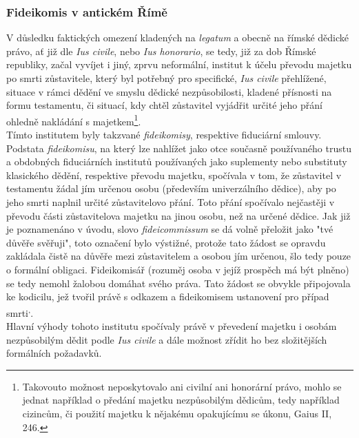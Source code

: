 \documentclass{article}
\begin{document}

\subsubsection{Fideikomis v antickém Římě}

V důsledku faktických omezení kladených na \textit{legatum} a obecně na římské dědické právo, ať již dle \textit{Ius civile}, nebo \textit{Ius honorario}, se tedy, již za dob Římské republiky, začal vyvíjet i jiný, zprvu neformální, institut k účelu převodu majetku po smrti zůstavitele, který byl potřebný pro specifické, \textit{Ius civile} přehlížené, situace v rámci dědění ve smyslu dědické nezpůsobilosti, kladené přísnosti na formu testamentu, či situací, kdy chtěl zůstavitel vyjádřit určité jeho přání ohledně nakládání s majetkem\footnote{Takovouto možnost neposkytovalo ani civilní ani honorární právo, mohlo se jednat například o předání majetku nezpůsobilým dědicům, tedy například cizincům, či použití majetku k nějakému opakujícímu se úkonu, Gaius II, 246.}.\\

 Tímto institutem byly takzvané \textit{fideikomisy}, respektive fiduciární smlouvy. Podstata \textit{fideikomisu}, na který lze nahlížet jako otce současně používaného trustu a obdobných fiduciárních institutů používaných jako suplementy nebo substituty klasického dědění, respektive převodu majetku, spočívala v tom, že zůstavitel v testamentu žádal jím určenou osobu (především univerzálního dědice), aby po jeho smrti naplnil určité zůstavitelovo přání. Toto přání spočívalo nejčastěji v převodu části zůstavitelova majetku na jinou osobu, než na určené dědice. Jak již je poznamenáno v úvodu, slovo \textit{fideicommissum} se dá volně přeložit jako "tvé důvěře svěřuji", toto označení bylo výstižné, protože tato žádost se opravdu zakládala čistě na důvěře mezi zůstavitelem a osobou jím určenou, šlo tedy pouze o formální obligaci. Fideikomisář (rozuměj osoba v jejíž prospěch má být plněno) se tedy nemohl žalobou domáhat svého práva. Tato žádost se obvykle připojovala ke kodicilu, jež tvořil právě s odkazem a fideikomisem ustanovení pro případ smrti\textsuperscript{,}. \\

Hlavní výhody tohoto institutu spočívaly právě v převedení majetku i oso\-bám nezpůsobilým dědit podle \textit{Ius civile} a dále možnost zřídit ho bez složitějších formálních požadavků.\\
\end{document}
